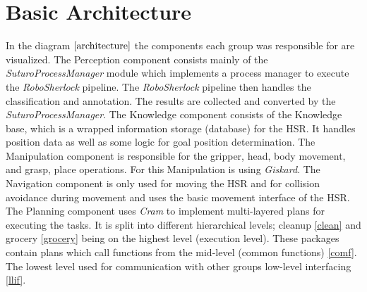 \documentclass[main.tex]{subfiles}
\begin{document}
		\section{Basic Architecture}

			In the diagram \(\ref{architecture}\) the components each group was responsible for are visualized. The Perception component consists mainly of the \textit{SuturoProcessManager} module which implements a process manager to execute the \textit{RoboSherlock} pipeline. The \textit{RoboSherlock} pipeline then handles the classification and annotation. The results are collected and converted by the \textit{SuturoProcessManager}.  The Knowledge component consists of the Knowledge base, which is a wrapped information storage (database) for the HSR. It handles position data as well as some logic for goal position determination. The Manipulation component is responsible for the gripper, head, body movement, and grasp, place operations. For this Manipulation is using \textit{Giskard}. The Navigation component is only used for moving the HSR and for collision avoidance during movement and uses the basic movement interface of the HSR. The Planning component uses \textit{Cram} to implement multi-layered plans for executing the tasks. It is split into different hierarchical levels; cleanup \ref{clean} and grocery \ref{grocery} being on the highest level (execution level). These packages contain plans which call functions from the mid-level (common functions) \ref{comf}. The lowest level used for communication with other groups low-level interfacing \ref{llif}.
			
\end{document}
